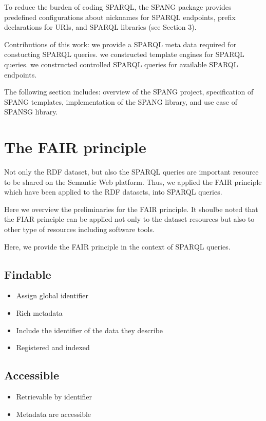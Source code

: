 \documentclass[runningheads]{llncs}
\begin{document}
To reduce the burden of coding SPARQL, the SPANG package provides predefined configurations about nicknames for SPARQL endpoints, prefix declarations for URIs, and SPARQL libraries (see Section 3).


Contributions of this work:
we provide a SPARQL meta data required for constucting SPARQL queries.
we constructed template engines for SPARQL queries.
we constructed controlled SPARQL queries for available SPARQL endpoints.


The following section includes: overview of the SPANG project, specification of SPANG templates, implementation of the SPANG library, and use case of SPANSG library.

\section{The FAIR principle}

Not only the RDF dataset, but also the SPARQL queries are important resource to be shared on the Semantic Web platform. Thus, we applied the FAIR principle which have been applied to the RDF datasets, into SPARQL queries.

Here we overview the preliminaries for the FAIR principle.
It shoulbe noted that the FIAR principle can be applied not only to the dataset resources but also to other type of resources including software tools.

Here, we provide the FAIR principle in the context of SPARQL queries.

\subsection{Findable}
\begin{itemize}
    \item Assign global identifier
    \item Rich metadata
    \item Include the identifier of the data they describe
    \item Registered and indexed
\end{itemize}

\subsection{Accessible}
\begin{itemize}
    \item Retrievable by identifier
    \item Metadata are accessible
\end{itemize}
\end{document}
